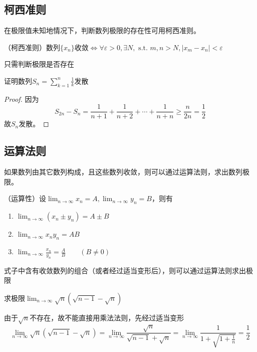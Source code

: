 \pagebreak
\subsection{柯西准则}
在极限值未知地情况下，判断数列极限的存在性可用柯西准则。
\begin{theorem}
    \label{th:柯西准则}
    （柯西准则）数列$\{x_n\}$收敛$\iff  \forall\varepsilon>0,\exists N,\text{ s.t. }m,n>N, \lvert x_m-x_n\rvert<\varepsilon$
\end{theorem}
\begin{situation}
    只需判断极限是否存在
\end{situation}
\begin{example}
    证明数列$S_n=\sum_{k=1}^n \frac{1}{k}$发散
\end{example}
\begin{proof}
    因为
    \[ S_{2n} - S_{n} = \frac{1}{n+1}+\frac{1}{n+2}+\cdots+\frac{1}{n+n} \geq \frac{n}{2n} = \frac{1}{2}\]
    故${S_n}$发散。
\end{proof}

\subsection{运算法则}
如果数列由其它数列构成，且这些数列收敛，则可以通过运算法则，求出数列极限。
\begin{theorem}
    \label{th:数列极限运算法则}
    （运算性）设$\lim_{n\to\infty}x_n=A,\lim_{n\to\infty}y_n=B$，则有
    \begin{enumerate}
        \item $\lim_{n\to\infty} (x_n\pm y_n)=A\pm B$
        \item $\lim_{n\to\infty} x_ny_n=AB$
        \item $\lim_{n\to\infty} \frac{x_n}{y_n} = \frac{A}{B} \qquad (B\neq 0)$
    \end{enumerate}
\end{theorem}
\begin{situation}
    式子中含有收敛数列的组合（或者经过适当变形后），则可以通过运算法则求出极限
\end{situation}
\begin{example}
    求极限$\lim_{n\to\infty}\sqrt{n}(\sqrt{n-1}-\sqrt{n})$
\end{example}
\begin{solution}
    由于$\sqrt{n}$不存在，故不能直接用乘法法则，先经过适当变形
    \[
        \lim_{n\to\infty}   \sqrt{n}(\sqrt{n-1}-\sqrt{n})
        = \lim_{n\to\infty} \frac{\sqrt{n}}{\sqrt{n-1}+\sqrt{n}}
        = \lim_{n\to\infty} \frac{1}{1+\sqrt{1+\frac{1}{n}}}
        =\frac{1}{2}
    \]
\end{solution}

